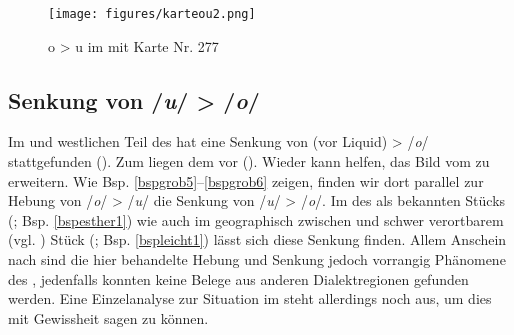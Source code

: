  \begin{figure}[h!]
		\centering
\texttt{[image: figures/karteou2.png]}
		\caption{\label{karteou} o > u im  mit  Karte Nr. 277}
		\end{figure}
\FloatBarrier
		
		




 
 \subsection{Senkung von /\textit{u}/ > /\textit{o}/} \label{u_o} 
Im  und westlichen Teil des  hat eine Senkung von  (vor Liquid)  > /\textit{o}/ stattgefunden (\cite[84]{Herzog1992}). 
Zum  liegen dem   vor (\cite[84]{Herzog1992}). Wieder kann  helfen, das Bild vom  zu erweitern. Wie Bsp. \ref{bspgrob5}–\ref{bspgrob6} zeigen, finden wir dort parallel zur Hebung von /\textit{o}/ > /\textit{u}/ die Senkung von /\textit{u}/ > /\textit{o}/. Im  des als  bekannten Stücks   (; Bsp. \ref{bspesther1}) wie auch im geographisch zwischen  und  schwer verortbarem (vgl. \cite[421]{FleischerSchaefer2012}) Stück  (; Bsp. \ref{bspleicht1}) lässt sich diese Senkung finden. Allem Anschein nach sind die hier behandelte Hebung und Senkung jedoch vorrangig  Phänomene des , jedenfalls konnten keine Belege aus anderen Dialektregionen gefunden werden. Eine Einzelanalyse zur Situation im  steht allerdings noch aus, um dies mit Gewissheit sagen zu können.\\


